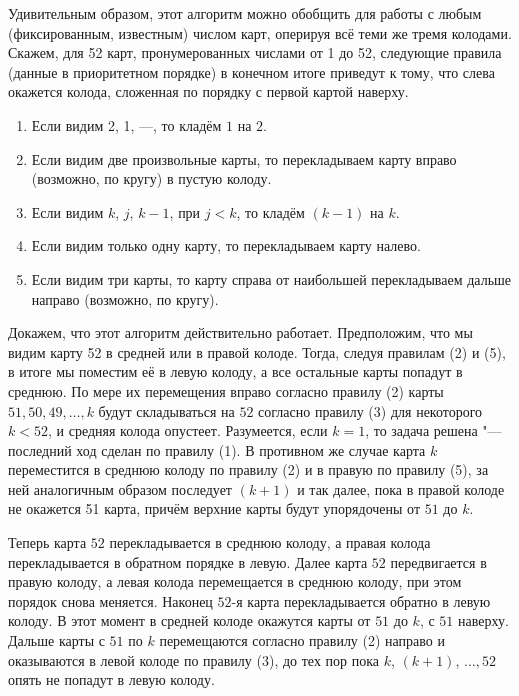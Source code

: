 \documentclass[twoside]{book}
\begin{document}
Удивительным образом, этот алгоритм можно обобщить для работы с любым (фиксированным, известным) числом карт, оперируя всё теми же тремя колодами.
Скажем, для 52 карт, пронумерованных числами от 1 до 52, следующие правила (данные в приоритетном порядке) в конечном итоге приведут к тому, что слева окажется колода, сложенная по порядку с первой картой наверху.

\begin{enumerate}[label=(\arabic*),noitemsep,leftmargin=\parindent,labelsep=3.5pt]
\item Если видим 2, 1, ---, то кладём $1$ на $2$.
\item Если видим две произвольные карты, то перекладываем карту вправо (возможно, по кругу) в пустую колоду.
\item Если видим $k$, $j$, $k-1$, при $j < k$, то кладём $(k-1)$ на $k$.
\item Если видим только одну карту, то перекладываем карту налево.
\item Если видим три карты, то карту справа от наибольшей перекладываем дальше направо (возможно, по кругу).
\end{enumerate}

Докажем, что этот алгоритм действительно работает.
Предположим, что мы видим карту 52 в средней или в правой колоде.
Тогда, следуя правилам (2) и (5), в итоге мы поместим её  в левую колоду, а все остальные карты попадут в среднюю.
По мере их перемещения вправо согласно правилу (2) карты $51, 50, 49, \dots, k$ будут складываться на $52$ согласно правилу (3) для некоторого $k < 52$, и средняя колода опустеет.
Разумеется, если $k = 1$, то задача решена "--- последний ход сделан по правилу (1).
В противном же случае карта $k$ переместится в среднюю колоду по правилу (2) и в правую по правилу (5), за ней аналогичным образом последует $(k+1)$ и так далее, пока в правой колоде не окажется 51 карта, причём верхние карты будут упорядочены от $51$ до $k$.

Теперь карта $52$ перекладывается в среднюю колоду,
а правая колода перекладывается в обратном порядке в левую.
Далее карта $52$ передвигается в правую колоду, а левая колода перемещается в среднюю колоду, при этом порядок снова меняется.
Наконец $52$-я карта перекладывается обратно в левую колоду.
В этот момент в средней колоде окажутся карты от $51$ до $k$, с $51$ наверху.
Дальше карты с $51$ по $k$ перемещаются согласно правилу (2) направо и оказываются в левой колоде по правилу (3), до тех пор пока $k$, $(k+1)$, $\dots, 52$ опять не попадут в левую колоду.
\end{document}
